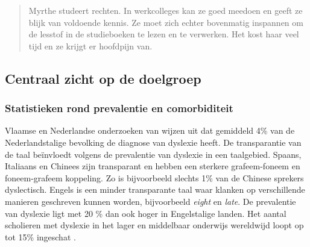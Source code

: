 \begin{quote}
	Myrthe studeert rechten. In werkcolleges kan ze goed meedoen en geeft ze blijk van voldoende kennis. Ze moet zich echter bovenmatig inspannen om de lesstof in de studieboeken te lezen en te verwerken. Het kost haar veel tijd en ze krijgt er hoofdpijn van.
\end{quote}

\subsection{Centraal zicht op de doelgroep}

\subsubsection{Statistieken rond prevalentie en comorbiditeit}

Vlaamse en Nederlandse onderzoeken van \textcite{Wentink2008, Desoete2017} wijzen uit dat gemiddeld 4\% van de Nederlandstalige bevolking de diagnose van dyslexie heeft. De transparantie van de taal beïnvloedt volgens \textcite{APA2013} de prevalentie van dyslexie in een taalgebied. Spaans, Italiaans en Chinees zijn transparant en hebben een sterkere grafeem-foneem en foneem-grafeem koppeling. Zo is bijvoorbeeld slechts 1\% van de Chinese sprekers dyslectisch. Engels is een minder transparante taal waar 
klanken op verschillende manieren geschreven kunnen worden, bijvoorbeeld \textit{eight} en \textit{late}. De prevalentie van dyslexie ligt met 20 \% dan ook hoger in Engelstalige landen. Het aantal scholieren met dyslexie in het lager en middelbaar onderwijs wereldwijd loopt op tot 15\% ingeschat \autocite{Bonte2020, VanDerMeer2022}.



